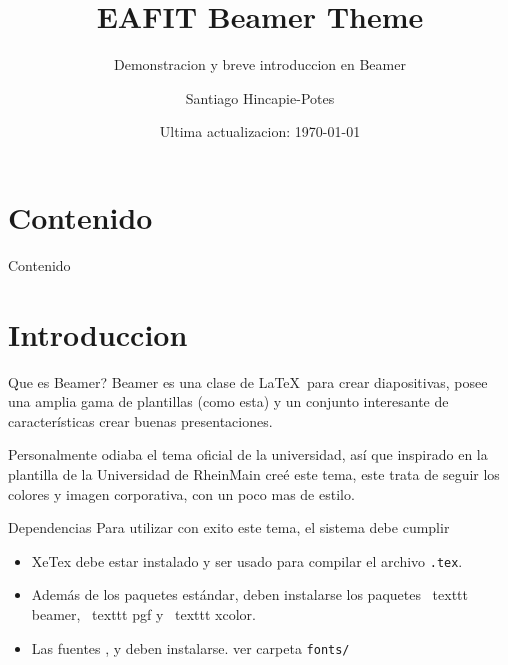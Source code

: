 \documentclass[compress]{beamer}
\title{EAFIT Beamer Theme}
\subtitle{Demonstracion y breve introduccion en Beamer}
\date{Ultima actualizacion: \today}
\author{Santiago Hincapie-Potes}
\institute{Universidad EAFIT}
\begin{document}

\maketitle

\section*{Contenido}
\begin{frame}{Contenido}
	\tableofcontents[hideallsubsections]
\end{frame}

\section{Introduccion}

\begin{frame}{Que es Beamer?}
  Beamer es una clase de \LaTeX\ para crear diapositivas, posee una amplia gama
  de plantillas (como esta) y un conjunto interesante de características crear
  buenas presentaciones.

  Personalmente odiaba el tema oficial de la universidad, así que inspirado en
  la plantilla de la Universidad de RheinMain creé este tema, este trata de
  seguir los colores y imagen corporativa, con un poco mas de estilo.
\end{frame}

\begin{frame}{Dependencias}
	Para utilizar con exito este tema, el sistema debe cumplir
	\begin{itemize}
		\item XeTex debe estar instalado y ser usado para compilar el archivo
		\texttt{.tex}.
		\item Además de los paquetes estándar, deben instalarse los paquetes \
		texttt {beamer}, \ texttt {pgf} y \ texttt {xcolor}. 
		\item Las fuentes ,  y
		 deben instalarse. ver carpeta \texttt{fonts/}
	\end{itemize}
\end{frame}
\end{document}
